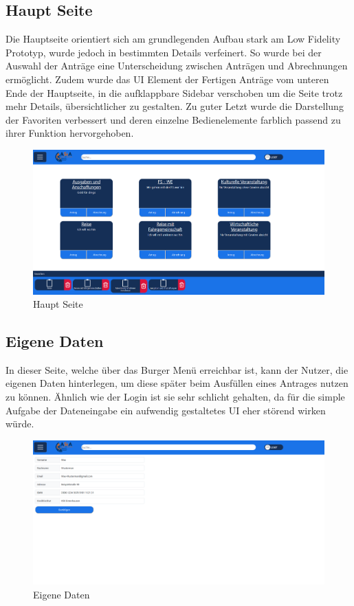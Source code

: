 \subsection{Haupt Seite}\label{Haupt Seite}
Die Hauptseite orientiert sich am grundlegenden Aufbau stark am Low Fidelity Prototyp,
wurde jedoch in bestimmten Details verfeinert. So wurde bei der Auswahl der Anträge eine
Unterscheidung zwischen Anträgen und Abrechnungen ermöglicht. Zudem wurde das \ac{UI}
Element der Fertigen Anträge vom unteren Ende der Hauptseite, in die aufklappbare Sidebar
verschoben um die Seite trotz mehr Details, übersichtlicher zu gestalten. Zu guter Letzt
wurde die Darstellung der Favoriten verbessert und deren einzelne Bedienelemente farblich
passend zu ihrer Funktion hervorgehoben.

\begin{figure}[h]
\centering
\includegraphics[width=1.0\textwidth]{Doc/images/Landing Page.png}
\caption{Haupt Seite}\label{Hautp Seite}
\end{figure}

\pagebreak

\subsection{Eigene Daten}\label{Eigene Daten}
In dieser Seite, welche über das Burger Menü erreichbar ist, kann der Nutzer, die eigenen
Daten hinterlegen, um diese später beim Ausfüllen eines Antrages nutzen zu können. Ähnlich
wie der Login ist sie sehr schlicht gehalten, da für die simple Aufgabe der Dateneingabe ein
aufwendig gestaltetes \ac{UI} eher störend wirken würde.

\begin{figure}[h]
\centering
\includegraphics[width=1.0\textwidth]{Doc/images/Own Data.png}
\caption{Eigene Daten}\label{Eigene Daten}
\end{figure}

